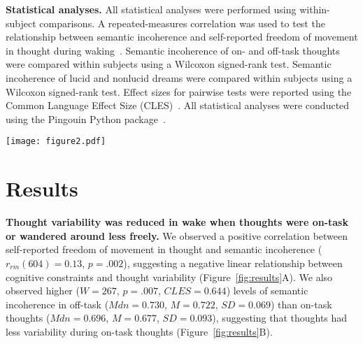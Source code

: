 \documentclass[10pt,a4paper,twocolumn]{article}
\begin{document}
\textbf{Statistical analyses.}
All statistical analyses were performed using within-subject comparisons. A repeated-measures correlation was used to test the relationship between semantic incoherence and self-reported freedom of movement in thought during waking~\cite{bakdash2017}. Semantic incoherence of on- and off-task thoughts were compared within subjects using a Wilcoxon signed-rank test. Semantic incoherence of lucid and nonlucid dreams were compared within subjects using a Wilcoxon signed-rank test. Effect sizes for pairwise tests were reported using the Common Language Effect Size (CLES)~\cite{vargha2000}. All statistical analyses were conducted using the Pingouin Python package~\cite{vallat2018}.



\begin{figure*}[t]
    \centering
    \texttt{[image: figure2.pdf]}
    \caption{\textbf{Semantic incoherence was reduced under cognitive control in wake and sleep.} (A) Over multiple days of experience sampling during waking, increased thought variability was associated with decreased self-reported freedom of movement in thought. Each circle represents a unique experience sample. Each color/line represents a unique participant. (B) Over multiple days of experience sampling during waking, being focused on a task was associated with decreased thought variability. (C) In public dream journals representing thought during sleep, lucid dreams were associated with reduced thought variability compared to nonlucid dreams. *$\mathit{p}<.05$, **$\mathit{p}<.01$}
    \label{fig:results}
\end{figure*}

\section*{Results}

\textbf{Thought variability was reduced in wake when thoughts were on-task or wandered around less freely.}
We observed a positive correlation between self-reported freedom of movement in thought and semantic incoherence ($\mathit{r_{rm}}(604)=0.13$, $\mathit{p}=.002$), suggesting a negative linear relationship between cognitive constraints and thought variability (Figure~\ref{fig:results}A). We also observed higher ($\mathit{W}=267$, $\mathit{p}=.007$, $\mathit{CLES}=0.644$) levels of semantic incoherence in off-task ($\mathit{Mdn}=0.730$, $\mathit{M}=0.722$, $\mathit{SD}=0.069$) than on-task thoughts ($\mathit{Mdn}=0.696$, $\mathit{M}=0.677$, $\mathit{SD}=0.093$), suggesting that thoughts had less variability during on-task thoughts (Figure~\ref{fig:results}B).
\end{document}
